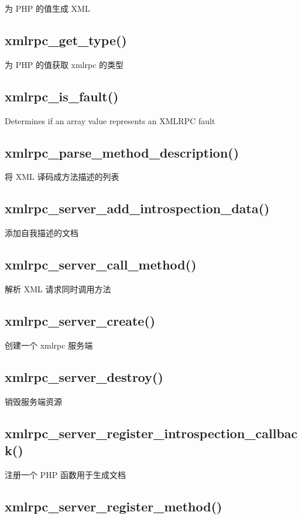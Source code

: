 为 PHP 的值生成 XML

\subsection{xmlrpc\_get\_type()}

为 PHP 的值获取 xmlrpc 的类型

\subsection{xmlrpc\_is\_fault()}

Determines if an array value represents an XMLRPC fault

\subsection{xmlrpc\_parse\_method\_description()}

将 XML 译码成方法描述的列表

\subsection{xmlrpc\_server\_add\_introspection\_data()}

添加自我描述的文档

\subsection{xmlrpc\_server\_call\_method()}

解析 XML 请求同时调用方法


\subsection{xmlrpc\_server\_create()}

创建一个 xmlrpc 服务端

\subsection{xmlrpc\_server\_destroy()}

销毁服务端资源

\subsection{xmlrpc\_server\_register\_introspection\_callback()}

注册一个 PHP 函数用于生成文档

\subsection{xmlrpc\_server\_register\_method()}


